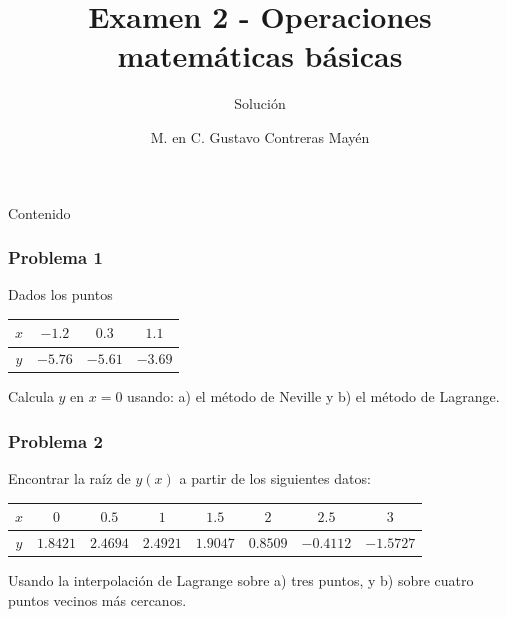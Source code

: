 


\title{Examen 2 - Operaciones matemáticas básicas}
\subtitle{Solución}
\author{M. en C. Gustavo Contreras Mayén}
\maketitle
\fontsize{14}{14}\selectfont
{}
\begin{frame}{Contenido}
\tableofcontents[pausesections]
\end{frame}
\begin{frame}[fragile]
\frametitle{Problema 1}
Dados los puntos
	\begin{table}[H]
		\centering 
		\begin{large}
			\begin{tabulary}{15cm}{c | c | c | c  }\normalsize
				$x$ & $-1.2$ & $0.3$ & $1.1$ \\
				\midrule
				$y$ & $-5.76$ & $-5.61$ & $-3.69$
			\end{tabulary}
		\end{large}
	\end{table}
	Calcula $y$ en $x=0$ usando: a) el método de Neville y b) el método de Lagrange.
	\\
	\medskip
	\visible<2->{\textcolor{red}{La raíz en ambos métodos, vale $-6.0$}}
\end{frame}
\begin{frame}
\frametitle{Problema 2}
Encontrar la raíz de $y(x)$ a partir de los siguientes datos:
	\begin{table}[H]
		\centering 
		\begin{large}
			\begin{tabulary}{15cm}{c | c | c | c | c | c | c | c }
				$x$ & $0$ & $0.5$ & $1$ & $1.5$ & $2$ & $2.5$ & $3$ \\
				\midrule
				$y$ & $1.8421$ & $2.4694$ & $2.4921$ & $1.9047$ & $0.8509$ & $-0.4112$ & $-1.5727$ 
			\end{tabulary}
		\end{large}	
	\end{table}
	Usando la interpolación de Lagrange sobre a) tres puntos, y b) sobre cuatro puntos vecinos más cercanos.
\end{frame}
